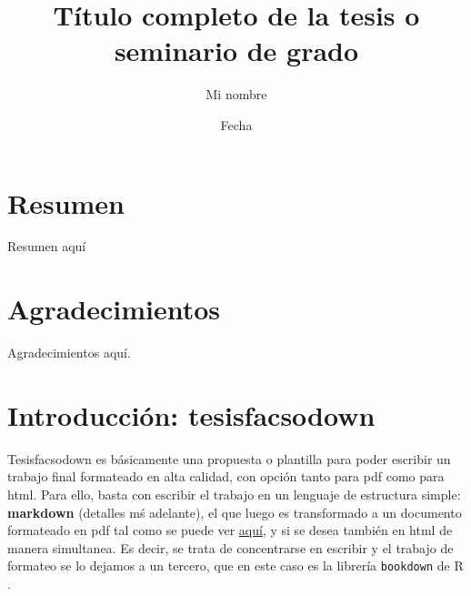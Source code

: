 \documentclass[12pt,twoside]{templates/facsothesis}
\title{Título completo de la tesis o seminario de grado}
\author{Mi nombre}
\date{Fecha}
\begin{document}

  \maketitle

\frontmatter %
\pagestyle{empty} %



  \setcounter{tocdepth}{1}
  \setlength{\parskip}{0pt}
  \tableofcontents

\setlength\parskip{1em plus 0.1em minus 0.2em}

  \listoftables

  \listoffigures



\mainmatter %
\pagestyle{fancyplain} %

\hypertarget{resumen}{%
\chapter*{Resumen}\label{resumen}}

Resumen aquí

\hypertarget{agradecimientos}{%
\chapter*{Agradecimientos}\label{agradecimientos}}

Agradecimientos aquí.

\hypertarget{introducciuxf3n-tesisfacsodown}{%
\chapter{Introducción: tesisfacsodown}\label{introducciuxf3n-tesisfacsodown}}

Tesisfacsodown es básicamente una propuesta o plantilla para poder escribir un trabajo final formateado en alta calidad, con opción tanto para pdf como para html. Para ello, basta con escribir el trabajo en un lenguaje de estructura simple: \textbf{markdown} (detalles mś adelante), el que luego es transformado a un documento formateado en pdf tal como se puede ver \href{docs/tesis.pdf}{aquí}, y si se desea también en html de manera simultanea. Es decir, se trata de concentrarse en escribir y el trabajo de formateo se lo dejamos a un tercero, que en este caso es la librería \texttt{bookdown} de R \citep{xie_Bookdown_2017} .
\end{document}
